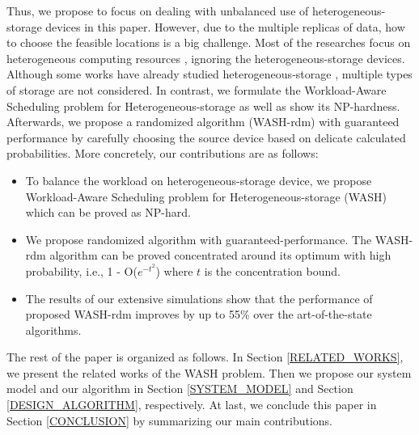 \documentclass[conference]{IEEEtran}
\begin{document}
Thus, we propose to focus on dealing with unbalanced use of heterogeneous-storage devices in this paper. However, due to the multiple replicas of data, how to choose the feasible locations is a big challenge.
Most of the researches focus on heterogeneous computing resources \cite{b25}\cite{b26}\cite{b35}\cite{b36}, ignoring the heterogeneous-storage devices. 
Although some works have already studied heterogeneous-storage \cite{b6}\cite{b7}, multiple types of storage are not considered. In contrast, we formulate the Workload-Aware Scheduling problem for Heterogeneous-storage as well as show its NP-hardness. Afterwards, we propose a randomized algorithm (WASH-rdm) with guaranteed performance by carefully choosing the source device based on delicate calculated probabilities.
More concretely, our contributions are as follows: 

\begin{itemize}
\item To balance the workload on heterogeneous-storage device, we propose Workload-Aware Scheduling problem for Heterogeneous-storage (WASH) which can be proved as NP-hard. 
\item We propose randomized algorithm with guaranteed-performance. The WASH-rdm algorithm can be proved concentrated around its optimum with high probability, i.e., 1 - O($e^{-t^2}$) where $t$ is the concentration bound.
\item The results of our extensive simulations show that the performance of proposed WASH-rdm improves by up to 55\% over the art-of-the-state algorithms.
\end{itemize}

The rest of the paper is organized as follows. In Section \ref{RELATED_WORKS}, we present the related works of the WASH problem. Then we propose our system model and our algorithm in Section  \ref{SYSTEM_MODEL} and Section \ref{DESIGN_ALGORITHM}, respectively. At last, we conclude this paper in Section \ref{CONCLUSION} by summarizing our main contributions.
\end{document}
